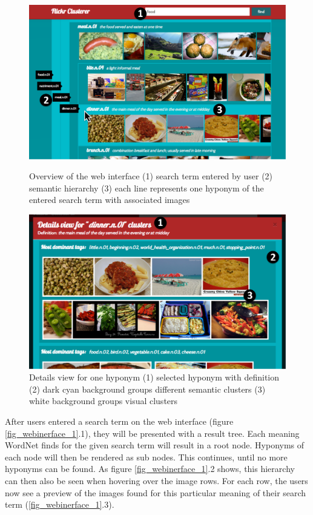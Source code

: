 \begin{figure}[!htb]
    \includegraphics[width=\linewidth]{images/webfrontend-screenshot_1.pdf}
    \caption{Overview of the web interface (1) search term entered by user (2) semantic hierarchy (3) each line represents one hyponym of the entered search term with associated images}\label{fig_webinerface_1}
  \endminipage\hfill
    \includegraphics[width=\linewidth]{images/webfrontend-screenshot_2.pdf}
    \caption{Details view for one hyponym (1) selected hyponym with definition (2) dark cyan background groups different semantic clusters (3) white background groups visual clusters}\label{fig_webinerface_2}
  \endminipage\hfill
\end{figure}


After users entered a search term on the web interface (figure \ref{fig_webinerface_1}.1), they will be presented with a result tree. 
Each meaning WordNet finds for the given search term will result in a root node. 
Hyponyms of each node will then be rendered as sub nodes. 
This continues, until no more hyponyms can be found. 
As figure \ref{fig_webinerface_1}.2 shows, this hierarchy can then also be seen when hovering over the image rows.
For each row, the users now see a preview of the images found for this particular meaning of their search term (\ref{fig_webinerface_1}.3).

